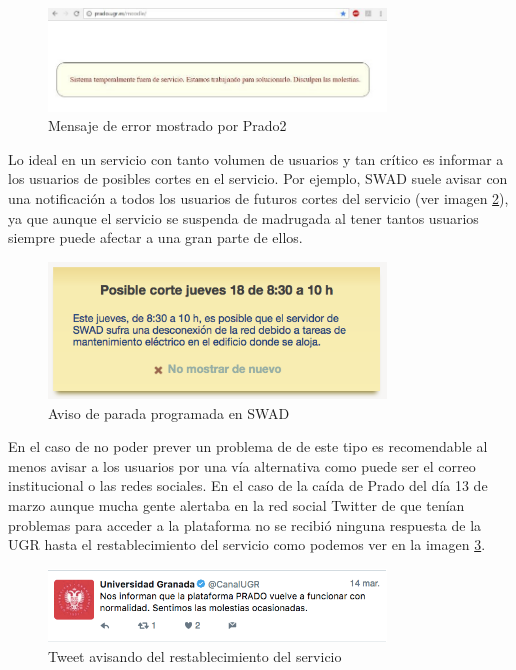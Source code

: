 \begin{figure}[h!]
\centering
\includegraphics[width=0.8\textwidth]{../images/pradocaido}
\caption{Mensaje de error mostrado por Prado2}
\label{fig:pradocaido}
\end{figure}

\bigskip
Lo ideal en un servicio con tanto volumen de usuarios y tan crítico es informar a los usuarios de posibles cortes en el servicio. Por ejemplo, SWAD suele avisar con una notificación a todos los usuarios de futuros cortes del servicio (ver imagen \ref{fig:paroprogramadoswad}), ya que aunque el servicio se suspenda de madrugada al tener tantos usuarios siempre puede afectar a una gran parte de ellos.

\begin{figure}[H]
\centering
\includegraphics[width=0.8\textwidth]{../images/paroprogramadoswad}
\caption{Aviso de parada programada en SWAD}
\label{fig:paroprogramadoswad}
\end{figure}

\bigskip
En el caso de no poder prever un problema de de este tipo es recomendable al menos avisar a los usuarios por una vía alternativa como puede ser el correo institucional o las redes sociales. En el caso de la caída de Prado del día 13  de marzo aunque mucha gente alertaba en la red social Twitter de que tenían problemas para acceder a la plataforma no se recibió ninguna respuesta de la UGR hasta el restablecimiento del servicio como podemos ver en la imagen \ref{fig:tweet}.



\begin{figure}[H]
\centering
\includegraphics[width=0.8\textwidth]{../images/tweet}
\caption{Tweet avisando del restablecimiento del servicio}
\label{fig:tweet}
\end{figure}

